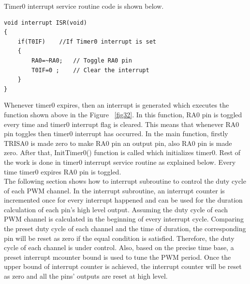 \documentclass{report}
\begin{document}
Timer0 interrupt service routine code is shown below.\\
\begin{lstlisting}[caption= Timer0 Interrupt service routine,label=fig32]
void interrupt ISR(void)
{
	if(T0IF)	//If Timer0 interrupt is set
	{
		RA0=~RA0;	// Toggle RA0 pin
		T0IF=0 ; 	// Clear the interrupt
	}
}
\end{lstlisting}
Whenever timer0 expires, then an interrupt is generated which executes the function shown above in the Figure ~\ref{fig32}. In this function, RA0 pin is toggled every time and timer0 interrupt flag is cleared. This means that whenever RA0 pin toggles then timer0 interrupt has occurred.
In the main function, firstly TRISA0 is made zero to make RA0 pin an output pin, also RA0 pin is made zero. After that, InitTimer0() function is called which initializes timer0. Rest of the work is done in timer0 interrupt service routine as explained below. Every time timer0 expires RA0 pin is toggled.\\
The following section shows how to  interrupt subroutine to control the duty cycle of each PWM channel. In the interrupt subroutine, an interrupt counter is incremented once for every interrupt happened and can be used for the duration calculation of each pin’s high level output. Assuming the duty cycle of each PWM channel is calculated in the beginning of every interrupt cycle. Comparing the preset duty cycle of each channel and the time of duration, the corresponding pin will be reset as zero if the equal condition is satisfied. Therefore, the duty cycle of each channel is under control. Also, based on the precise time base, a preset interrupt mcounter bound is used to tune the PWM period. Once the upper bound of interrupt counter is achieved, the interrupt counter will be reset as zero and all the pins’ outputs are reset at high level.\\
\end{document}
